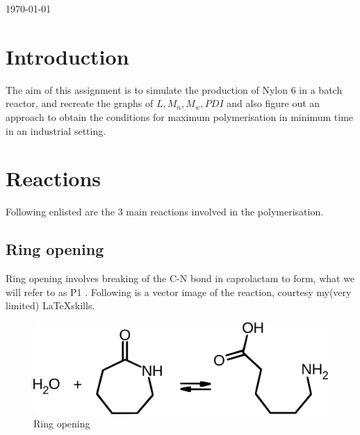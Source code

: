\begin{titlepage}

{\large \today}\\[3cm] %


 
\end{titlepage}

\section*{Introduction}
The aim of this assignment is to simulate the production of Nylon 6 in a batch reactor, and recreate the graphs of $L, M_n, M_w, PDI$ and also figure out an approach to obtain the conditions for maximum polymerisation in minimum time in an industrial setting.

\section*{Reactions}
Following enlisted are the 3 main reactions involved in the polymerisation. 

\subsection*{Ring opening}
Ring opening involves breaking of the C-N bond in caprolactam to form, what we will refer to as P1 .  Following is a vector image of the reaction, courtesy my(very limited) \LaTeX  skills.
\begin{figure}
\centering
\caption{Ring opening}
\includegraphics[scale=0.2]{ringopening.pdf}
\end{figure}
